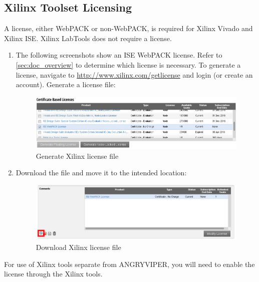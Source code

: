 \subsection{Xilinx Toolset Licensing}
\label{xilinx}
A license, either WebPACK or non-WebPACK, is required for Xilinx Vivado and Xilinx ISE. Xilinx LabTools does not require a license.
\begin{enumerate}
\item The following screenshots show an ISE WebPACK license. Refer to \ref{sec:doc_overview} to determine which license is necessary. To generate a license, navigate to \url{http://www.xilinx.com/getlicense} and login (or create an account). Generate a license file:

\begin{figure}[H]
	\centerline{\includegraphics[scale=0.5]{./figures/xilinx_license_gen.jpg}}
	\caption{Generate Xilinx license file}
\end{figure}

\item Download the file and move it to the intended location:

\begin{figure}[H]
	\centerline{\includegraphics[scale=0.5]{./figures/xilinx_license_download.jpg}}
	\caption{Download Xilinx license file}
\end{figure}
\end{enumerate}

For use of Xilinx tools separate from ANGRYVIPER, you will need to enable the license through the Xilinx tools.\newline

